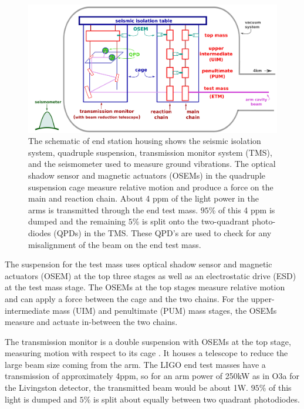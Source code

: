 \documentclass[12pt]{iopart}
\begin{document}
\begin{figure}
    \centering
    \includegraphics[width=\textwidth]{EndStationDiagram3.png}
    \caption{The schematic of end station housing shows the seismic isolation system, quadruple suspension, transmission monitor system (TMS), and the seismometer used to measure ground vibrations. The optical shadow sensor and magnetic actuators (OSEMs) in the quadruple suspension cage measure relative motion and produce a force on the main and reaction chain. About 4 ppm of the light power in the arms is transmitted through the end test mass. $95$\% of this 4 ppm is dumped and the remaining $5$\% is split onto the two-quadrant photo-diodes (QPDs) in the TMS. These QPD's are used to check for any misalignment of the beam on the end test mass. }
    \label{fig:end_station}
\end{figure}
The suspension for the test mass uses optical shadow sensor and magnetic actuators (OSEM)  at the top three stages as well as an electrostatic drive (ESD) at the test mass stage. The OSEMs at the top stages measure relative motion and can apply a force between the cage and the two chains. For the upper-intermediate mass (UIM) and penultimate (PUM) mass stages, the OSEMs measure and actuate in-between the two chains. 

The transmission monitor is a double suspension with OSEMs at the top stage, measuring motion with respect to its cage \cite{Barsotti_2010}. It houses a telescope to reduce the large beam size coming from the arm. The LIGO end test masses have a transmission of approximately 4ppm, so for an arm power of 250kW as in O3a for the Livingston detector, the transmitted beam would be about 1W. $95\%$ of this light is dumped and $5\%$ is split about equally between two quadrant photodiodes.
\end{document}
